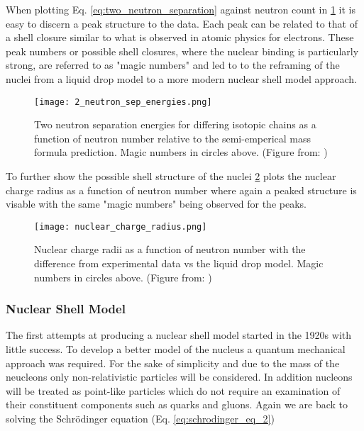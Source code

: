 \documentclass[jon_ringuette_thesis.tex]{subfiles}
\begin{document}
    When plotting Eq. \ref{eq:two_neutron_separation} against neutron count in \ref{fig:2_neutron_sep_energies} it is easy to discern a peak structure to the data.
    Each peak can be related to that of a shell closure similar to what is observed in atomic physics for electrons.
    These peak numbers or possible shell closures, where the nuclear binding is particularly strong, are referred to as "magic numbers" and led to to the reframing of the nuclei from a liquid drop model to a more modern nuclear shell model approach.

    \begin{figure}[H]
        \begin{center}
            \texttt{[image: 2\_neutron\_sep\_energies.png]}
        \end{center}
        \caption{Two neutron separation energies for differing isotopic chains as a function of neutron number relative to the semi-emperical mass formula prediction. Magic numbers in circles above. (Figure from: \cite{Bacca2016}) }
        \label{fig:2_neutron_sep_energies}
    \end{figure}

    To further show the possible shell structure of the nuclei \ref{fig:nuclear_charge_radius} plots the nuclear charge radius as a function of neutron number where again a peaked structure is visable with the same "magic numbers" being observed for the peaks.
    \begin{figure}[H]
        \begin{center}
            \texttt{[image: nuclear\_charge\_radius.png]}
        \end{center}
        \caption{Nuclear charge radii as a function of neutron number with the difference from experimental data vs the liquid drop model. Magic numbers in circles above. (Figure from: \cite{Bacca2016})   }
        \label{fig:nuclear_charge_radius}
    \end{figure}

    \subsubsection{Nuclear Shell Model}
    The first attempts at producing a nuclear shell model started in the 1920s with little success. To develop a better model of the nucleus a quantum mechanical approach was required. For the sake of simplicity and due to the mass of the neucleons only non-relativistic particles will be considered.
    In addition nucleons will be treated as point-like particles which do not require an examination of their constituent components such as quarks and gluons.
    Again we are back to solving the Schr\"odinger equation (Eq. \ref{eq:schrodinger_eq_2})
\end{document}
